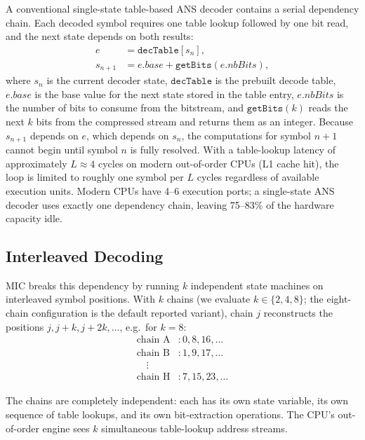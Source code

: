 \documentclass[journal]{IEEEtran}
\begin{document}
A conventional single-state table-based ANS decoder contains a serial
dependency chain. Each decoded symbol requires one table lookup followed by
one bit read, and the next state depends on both results:
\begin{equation}
\begin{aligned}
  e &= \texttt{decTable}[s_n], \\
  s_{n+1} &= e.\textit{base} + \texttt{getBits}(e.\textit{nbBits}),
\end{aligned}
\end{equation}
where $s_n$ is the current decoder state, $\texttt{decTable}$ is the
prebuilt decode table, $e.\textit{base}$ is the base value for the next
state stored in the table entry, $e.\textit{nbBits}$ is the number of bits
to consume from the bitstream, and $\texttt{getBits}(k)$ reads the next $k$
bits from the compressed stream and returns them as an integer.
Because $s_{n+1}$ depends on $e$, which depends on $s_n$, the computations
for symbol $n+1$ cannot begin until symbol $n$ is fully resolved.
With a table-lookup latency of approximately $L \approx 4$ cycles on modern
out-of-order CPUs (L1 cache hit), the loop is limited to roughly one symbol per
$L$ cycles regardless of available execution units. Modern CPUs have 4--6
execution ports; a single-state ANS decoder uses exactly one dependency chain,
leaving 75--83\% of the hardware capacity idle.

\subsection{Interleaved Decoding}

MIC breaks this dependency by running $k$ independent state machines on
interleaved symbol positions. With $k$ chains (we evaluate $k\in\{2,4,8\}$;
the eight-chain configuration is the default reported variant), chain $j$
reconstructs the positions $j, j+k, j+2k, \ldots$, e.g.\ for $k=8$:
\begin{align*}
  \text{chain A}&: 0, 8, 16, \ldots \\
  \text{chain B}&: 1, 9, 17, \ldots \\
  \quad \vdots\ &\\
  \text{chain H}&: 7, 15, 23, \ldots
\end{align*}

The chains are completely independent: each has its own state variable,
its own sequence of table lookups, and its own bit-extraction operations.
The CPU's out-of-order engine sees $k$ simultaneous table-lookup address
streams.
\end{document}
